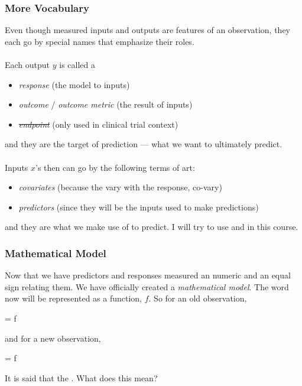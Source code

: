 \documentclass[slides]{beamer} %
\begin{document}
\begin{frame}\frametitle{More Vocabulary}

\small
Even though measured inputs and outputs are features of an observation, they each go by special names that emphasize their roles. \\~\\

Each output $y$ is called a

\begin{itemize}
\item \textit{response} (the model  to inputs)
\item \textit{outcome} / \textit{outcome metric} (the result of inputs)
\item \sout{\textit{endpoint}} (only used in clinical trial context)
\end{itemize}

and they are the target of prediction --- what we want to ultimately predict. \\~\\

Inputs $x$'s then can go by the following terms of art:

\begin{itemize}
\item \textit{covariates} (because the vary with the response, co-vary)
\item \textit{predictors} (since they will be the inputs used to make predictions)
\end{itemize}

and they are what we make use of to predict. I will try to use  and  in this course.

\end{frame}


\begin{frame}\frametitle{Mathematical Model}

Now that we have predictors and responses measured an numeric and an equal sign relating them. We have officially created a \textit{mathematical model}. The word  now will be represented as a function, $f$. So for an old observation,

\beqn
{} = f 
\eeqn

and for a new observation,

\beqn
{} = f 
\eeqn

It is said that the . What does this mean?
	
\end{frame}
\end{document}
